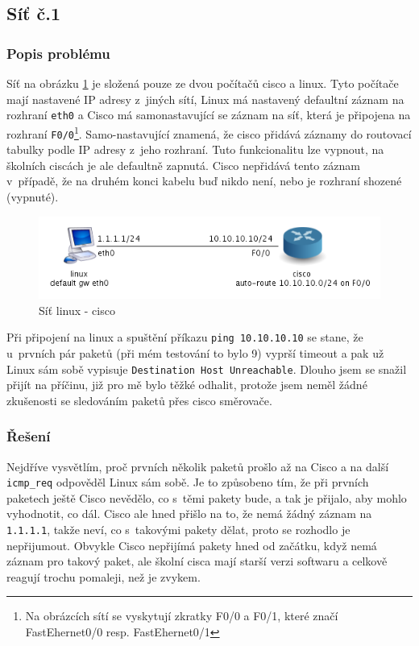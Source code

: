 
\subsection{Síť č.1}
\subsubsection{Popis problému}
Síť na obrázku \ref{fig:sit_2pc} je složená pouze ze dvou počítačů cisco a linux. Tyto počítače mají nastavené IP adresy z~jiných sítí, Linux má nastavený defaultní záznam na rozhraní \verb|eth0| a Cisco má samonastavující se záznam na síť, která je připojena na rozhraní \verb|F0/0|\footnote{Na obrázcích sítí se vyskytují zkratky F0/0 a F0/1, které značí FastEhernet0/0 resp. FastEhernet0/1}. Samo-nastavující znamená, že cisco přidává záznamy do routovací tabulky podle IP adresy z~jeho rozhraní. Tuto funkcionalitu lze vypnout, na školních ciscách je ale defaultně zapnutá. Cisco nepřidává tento záznam v~případě, že na druhém konci kabelu buď nikdo není, nebo je rozhraní shozené (vypnuté).

\begin{figure}[h]
\begin{center}
\includegraphics[width=13cm]{figures/sit_2pc.png}
\caption{Síť linux - cisco}
\label{fig:sit_2pc}
\end{center}
\end{figure}

Při připojení na linux a spuštění příkazu \verb|ping 10.10.10.10| se stane, že u~prvních pár paketů (při mém testování to bylo 9) vyprší timeout a pak už Linux sám sobě vypisuje \verb|Destination Host Unreachable|. Dlouho jsem se snažil přijít na příčinu, již pro mě bylo těžké odhalit, protože jsem neměl žádné zkušenosti se sledováním paketů přes cisco směrovače. 

\subsubsection{Řešení} 
Nejdříve vysvětlím, proč prvních několik paketů prošlo až na Cisco a na další \verb|icmp_req| odpověděl Linux sám sobě. Je to způsobeno tím, že při prvních paketech ještě Cisco nevědělo, co s~těmi pakety bude, a tak je přijalo, aby mohlo vyhodnotit, co dál. Cisco ale hned přišlo na to, že nemá žádný záznam na \verb|1.1.1.1|, takže neví, co s~takovými pakety dělat, proto se rozhodlo je nepřijumout. Obvykle Cisco nepřijímá pakety hned od začátku, když nemá záznam pro takový paket, ale školní cisca mají starší verzi softwaru a celkově reagují trochu pomaleji, než je zvykem.

